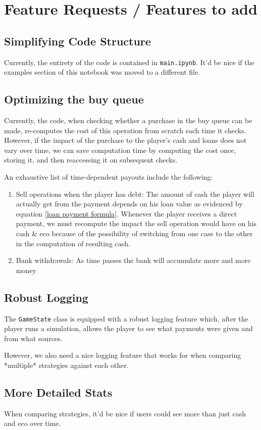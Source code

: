 \documentclass[12pt,letterpaper]{article}
\theoremstyle{remark}
\theoremstyle{plain}
\begin{document}
\section{Feature Requests / Features to add}

\subsection{Simplifying Code Structure}

Currently, the entirety of the code is contained in \texttt{main.ipynb}. It'd be nice if the examples section of this notebook was moved to a different file.

\subsection{Optimizing the buy queue}

Currently, the code, when checking whether a purchase in the buy queue can be made, re-computes the cost of this operation from scratch each time it checks. However, if the impact of the purchase to the player's cash and loans does not vary over time, we can save computation time by computing the cost once, storing it, and then reaccessing it on subsequent checks.

An exhaustive list of time-dependent payouts include the following:
\begin{enumerate}
    \item Sell operations when the player has debt: The amount of cash the player will actually get from the payment depends on his loan value as evidenced by equation \ref{loan payment formula}. Whenever the player receives a direct payment, we must recompute the impact the sell operation would have on his cash \& eco because of the possibility of switching from one case to the other in the computation of resulting cash.
    \item Bank withdrawals: As time passes the bank will accumulate more and more money
\end{enumerate}

\subsection{Robust Logging}

The \texttt{GameState} class is equipped with a robust logging feature which, after the player runs a simulation, allows the player to see what payments were given and from what sources.

However, we also need a nice logging feature that works for when comparing *multiple* strategies against each other.

\subsection{More Detailed Stats}

When comparing strategies, it'd be nice if users could see more than just cash and eco over time.
\end{document}
